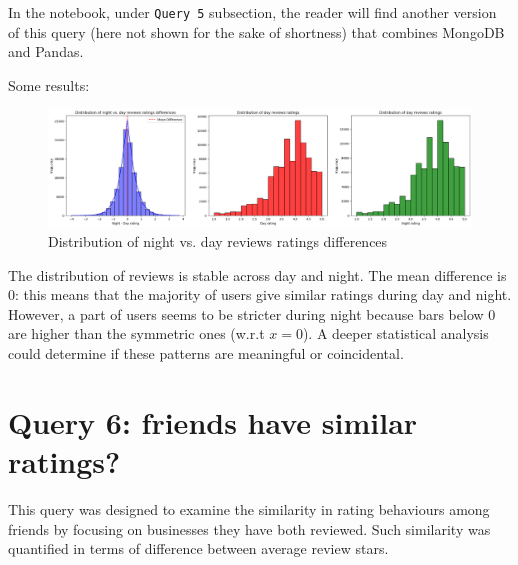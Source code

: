 \documentclass{Configuration_Files/PoliMi3i_thesis}
\begin{document}
\bigskip

In the notebook, under \texttt{Query 5} subsection, the reader will find another version of this query (here not shown for the sake of shortness) that combines MongoDB and Pandas.

Some results:

\bigskip

\begin{figure}[H]
    \centering
    \includegraphics[width=\columnwidth]{imgs/query_5.png}
    \caption{Distribution of night vs. day reviews ratings differences}
    \label{fig:query_5}
\end{figure}

\bigskip

The distribution of reviews is stable across day and night. The mean difference is $0$: this means that the majority of users give similar ratings during day and night. However, a part of users seems to be stricter during night because bars below $0$ are higher than the symmetric ones (w.r.t $x = 0$). A deeper statistical analysis could determine if these patterns are meaningful or coincidental.

\section{Query 6: friends have similar ratings?}
This query was designed to examine the similarity in rating behaviours among friends by focusing on businesses they have both reviewed. Such similarity was quantified in terms of difference between average review stars.
\end{document}
